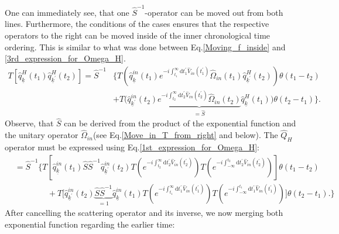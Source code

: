 \documentclass[12pt, titlepage]{article}
\begin{document}
One can immediately see, that one $ \hat{S}^{-1} $-operator can be moved out from both lines. Furthermore, the conditions of the cases ensures that the respective operators to the right can be moved inside of the inner chronological time ordering. This is similar to what was done between Eq.\enskip\eqref{Moving_f_inside} and \eqref{3rd_expression_for_Omega_H}. 
\begin{equation}
\begin{split}
T\left[
\hat{q}^{H}_{\underline{k}}(t_1)
\hat{q}^{H}_{\underline{k}^{\prime}}(t_2)
\right]
=
\hat{S}^{-1}
&\Big\{
T\left(\hat{q}^{in}_{\underline{k}}(t_1)  e^{-i\int_{t_{1}}^{\infty}\mathrm{d}t^{\prime}_{1} \hat{V}_{in}(t_{1}^{\prime})}\hat{\Omega}_{in}(t_1) \hat{q}^{H}_{\underline{k}^{\prime}}(t_2)\right)   \theta(t_1 - t_2)
		\\
    &+T\Big( \hat{q}^{in}_{\underline{k}^{\prime}}(t_2)  
    \underbrace{
    e^{-i\int_{t_{2}}^{\infty}\mathrm{d}t^{\prime}_{2} \hat{V}_{in}(t_{2}^{\prime})}\hat{\Omega}_{in}(t_2)  }_{=\hat{S}}
    \hat{q}^{H}_{\underline{k}}(t_1)
    \Big)
        \theta(t_2 - t_1)
    \Big\}.  
    \end{split}
\end{equation}
Observe, that $ \hat{S} $ can be derived from the product of the exponential function and the unitary operator $ \hat{\Omega}_{in} $(see Eq.\enskip\eqref{Move_in_T_from_right} and below). The $ \hat{Q}_{H}$ operator must be expressed using Eq.\enskip\eqref{1st_expression_for_Omega_H}:
\begin{equation}
\begin{split}
&=\hat{S}^{-1}
\Big\{
T\left[
	\hat{q}^{in}_{\underline{k}}(t_1)\hat{S} \hat{S}^{-1}
	\hat{q}^{in}_{\underline{k}^{\prime}}(t_2)
 	T\left( 
 		e^{-i\int_{t_{2}}^{\infty}\mathrm{d}t_{2}^{\prime} \hat{V}_{in}(t_{2}^{\prime})}
	\right)
 	T\left( 
 		e^{-i\int_{-\infty}^{t_{2}}\mathrm{d}t_{2}^{\prime} \hat{V}_{in}(t_{2}^{\prime})}
 	\right)
\right]
				  \theta(t_1 - t_2)
		\\
&\qquad\qquad +T\Big[
	\hat{q}^{in}_{\underline{k}^{\prime}}(t_2)\underbrace{\hat{S} \hat{S}^{-1}}_{=1}
	\hat{q}^{in}_{\underline{k}}(t_1)
 	T\left( 
 		e^{-i\int_{t_{1}}^{\infty}\mathrm{d}t_{1}^{\prime} \hat{V}_{in}(t_{1}^{\prime})}
	\right)
 	T\left( 
 		e^{-i\int_{-\infty}^{t_{1}}\mathrm{d}t_{1}^{\prime} \hat{V}_{in}(t_{1}^{\prime})}
 	\right)
\Big]
        \theta(t_2 - t_1).
    \Big\}  
    \end{split}
\end{equation}
After cancelling the scattering operator and its inverse, we now merging both exponential function regarding the earlier time:
\end{document}
